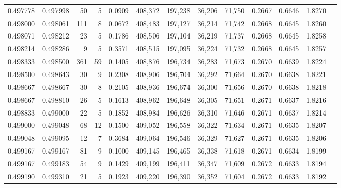 \begin{tabular}{rrrrrrrrrrrrr}
0.497778 & 0.497998 &    50 &   5 &                                     0.0909 & 408,372 & 197,238 &  36,206 &  71,750 & 0.2667 & 0.6646 & 1.8270 \\
0.498000 & 0.498061 &   111 &   8 &                                     0.0672 & 408,483 & 197,127 &  36,214 &  71,742 & 0.2668 & 0.6645 & 1.8260 \\
0.498071 & 0.498212 &    23 &   5 &                                     0.1786 & 408,506 & 197,104 &  36,219 &  71,737 & 0.2668 & 0.6645 & 1.8258 \\
0.498214 & 0.498286 &     9 &   5 &                                     0.3571 & 408,515 & 197,095 &  36,224 &  71,732 & 0.2668 & 0.6645 & 1.8257 \\
0.498333 & 0.498500 &   361 &  59 &                                     0.1405 & 408,876 & 196,734 &  36,283 &  71,673 & 0.2670 & 0.6639 & 1.8224 \\
0.498500 & 0.498643 &    30 &   9 &                                     0.2308 & 408,906 & 196,704 &  36,292 &  71,664 & 0.2670 & 0.6638 & 1.8221 \\
0.498667 & 0.498667 &    30 &   8 &                                     0.2105 & 408,936 & 196,674 &  36,300 &  71,656 & 0.2670 & 0.6638 & 1.8218 \\
0.498667 & 0.498810 &    26 &   5 &                                     0.1613 & 408,962 & 196,648 &  36,305 &  71,651 & 0.2671 & 0.6637 & 1.8216 \\
0.498833 & 0.499000 &    22 &   5 &                                     0.1852 & 408,984 & 196,626 &  36,310 &  71,646 & 0.2671 & 0.6637 & 1.8214 \\
0.499000 & 0.499048 &    68 &  12 &                                     0.1500 & 409,052 & 196,558 &  36,322 &  71,634 & 0.2671 & 0.6635 & 1.8207 \\
0.499048 & 0.499095 &    12 &   7 &                                     0.3684 & 409,064 & 196,546 &  36,329 &  71,627 & 0.2671 & 0.6635 & 1.8206 \\
0.499167 & 0.499167 &    81 &   9 &                                     0.1000 & 409,145 & 196,465 &  36,338 &  71,618 & 0.2671 & 0.6634 & 1.8199 \\
0.499167 & 0.499183 &    54 &   9 &                                     0.1429 & 409,199 & 196,411 &  36,347 &  71,609 & 0.2672 & 0.6633 & 1.8194 \\
0.499190 & 0.499310 &    21 &   5 &                                     0.1923 & 409,220 & 196,390 &  36,352 &  71,604 & 0.2672 & 0.6633 & 1.8192 \\

\end{tabular}
